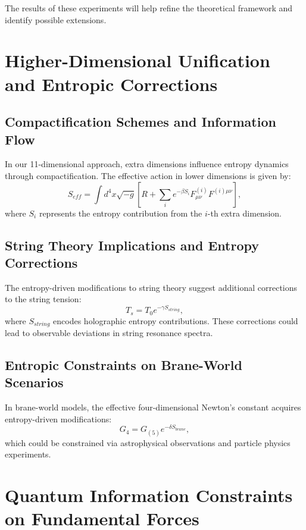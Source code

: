 \documentclass{article}
\begin{document}
The results of these experiments will help refine the theoretical framework and identify possible extensions.

\section{Higher-Dimensional Unification and Entropic Corrections}

\subsection{Compactification Schemes and Information Flow}
In our 11-dimensional approach, extra dimensions influence entropy dynamics through compactification. The effective action in lower dimensions is given by:
\begin{equation}
S_{eff} = \int d^4x \sqrt{-g} \left[ R + \sum_{i} e^{-\beta S_i} F^{(i)}_{\mu\nu} F^{(i)\mu\nu} \right],
\end{equation}
where $S_i$ represents the entropy contribution from the $i$-th extra dimension.

\subsection{String Theory Implications and Entropy Corrections}
The entropy-driven modifications to string theory suggest additional corrections to the string tension:
\begin{equation}
T_s = T_0 e^{-\gamma S_{string}},
\end{equation}
where $S_{string}$ encodes holographic entropy contributions. These corrections could lead to observable deviations in string resonance spectra.

\subsection{Entropic Constraints on Brane-World Scenarios}
In brane-world models, the effective four-dimensional Newton's constant acquires entropy-driven modifications:
\begin{equation}
G_4 = G_{(5)} e^{-\delta S_{brane}},
\end{equation}
which could be constrained via astrophysical observations and particle physics experiments.

\section{Quantum Information Constraints on Fundamental Forces}
\end{document}
